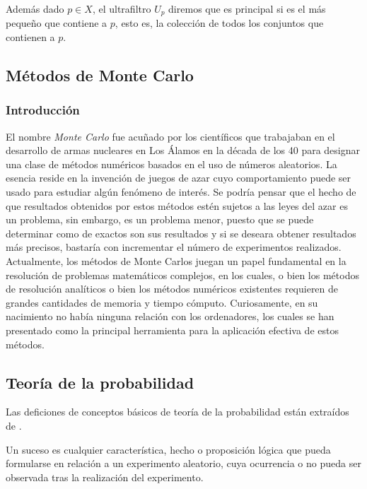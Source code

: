 \documentclass[../proyecto.tex]{memoir}
\begin{document}
Además dado $p \in X$, el ultrafiltro $U_{p}$ diremos que es principal si es el más pequeño que contiene a $p$, esto es, la colección de todos los conjuntos que contienen a $p$.

\subsection{Métodos de Monte Carlo}

\subsubsection{Introducción}

El nombre \textit{Monte Carlo} fue acuñado por los científicos que trabajaban en el desarrollo de armas nucleares en Los Álamos en la década de los 40 para designar una clase de métodos numéricos basados en el uso de números aleatorios. La esencia reside en la invención de juegos de azar cuyo comportamiento puede ser usado para estudiar algún fenómeno de interés. Se podría pensar que el hecho de que resultados obtenidos por estos métodos estén sujetos a las leyes del azar es un problema, sin embargo, es un problema menor, puesto que se puede determinar como de exactos son sus resultados y si se deseara obtener resultados más precisos, bastaría con incrementar el número de experimentos realizados. Actualmente, los métodos de Monte Carlos juegan un papel fundamental en la resolución de problemas matemáticos complejos, en los cuales, o bien los métodos de resolución analíticos o bien los métodos numéricos existentes requieren de grandes cantidades de memoria y tiempo cómputo. Curiosamente, en su nacimiento no había ninguna relación con los ordenadores, los cuales se han presentado como la principal herramienta para la aplicación efectiva de estos métodos.


\subsection{Teoría de la probabilidad}

 
Las deficiones de conceptos básicos de teoría de la probabilidad están extraídos de \cite{proman}. 


Un suceso es cualquier característica, hecho o proposición lógica que pueda formularse en relación a un experimento aleatorio, cuya ocurrencia o no pueda ser observada tras la realización del experimento.
\end{document}

